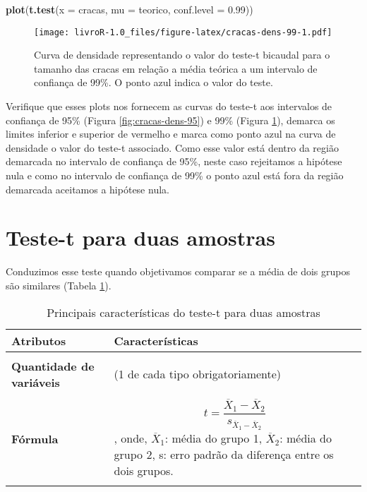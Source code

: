 \documentclass[titlepage, oneside, openany, a4paper]{book}
\newenvironment{Shaded}{\begin{snugshade}}{\end{snugshade}}
\newcommand{\DataTypeTok}[1]{\textcolor[rgb]{0.13,0.29,0.53}{#1}}
\newcommand{\FloatTok}[1]{\textcolor[rgb]{0.00,0.00,0.81}{#1}}
\newcommand{\KeywordTok}[1]{\textcolor[rgb]{0.13,0.29,0.53}{\textbf{#1}}}
\newcommand{\NormalTok}[1]{#1}
\begin{document}
\begin{Shaded}
\begin{Highlighting}[]
\KeywordTok{plot}\NormalTok{(}\KeywordTok{t.test}\NormalTok{(}\DataTypeTok{x =}\NormalTok{ cracas, }\DataTypeTok{mu =}\NormalTok{ teorico, }\DataTypeTok{conf.level =} \FloatTok{0.99}\NormalTok{))}
\end{Highlighting}
\end{Shaded}

\begin{figure}
\centering
\texttt{[image: livroR-1.0\_files/figure-latex/cracas-dens-99-1.pdf]}
\caption{\label{fig:cracas-dens-99}Curva de densidade representando o valor do teste-t bicaudal para o tamanho das cracas em relação a média teórica a um intervalo de confiança de 99\%. O ponto azul indica o valor do teste.}
\end{figure}

Verifique que esses plots nos fornecem as curvas do teste-t aos intervalos de confiança de 95\% (Figura \ref{fig:cracas-dens-95}) e 99\% (Figura \ref{fig:cracas-dens-99}), demarca os limites inferior e superior de vermelho e marca como ponto azul na curva de densidade o valor do teste-t associado. Como esse valor está dentro da região demarcada no intervalo de confiança de 95\%, neste caso rejeitamos a hipótese nula e como no intervalo de confiança de 99\% o ponto azul está fora da região demarcada aceitamos a hipótese nula.

\hypertarget{teste-t-para-duas-amostras}{%
\section{Teste-t para duas amostras}\label{teste-t-para-duas-amostras}}

Conduzimos esse teste quando objetivamos comparar se a média de dois grupos são similares (Tabela \ref{tab:tab2t}).

\begin{table}

\caption{\label{tab:tab2t}Principais características do teste-t para duas amostras}
\centering
\begin{tabular}[c]{>{\raggedright\arraybackslash}p{10em}>{\raggedright\arraybackslash}p{30em}}
\toprule
Atributos & Características\\
\midrule
\textbf{\cellcolor{gray!6}{Tipo de variável}} & \cellcolor{gray!6}{Quantitativa e categórica}\\
\textbf{Quantidade de variáveis} & 2 (1 de cada tipo obrigatoriamente)\\
\textbf{\cellcolor{gray!6}{Hipótese nula}} & \cellcolor{gray!6}{A diferença na média da variável quantitativa dos grupos é igual a 0.}\\
\textbf{Fórmula} & $$t=\frac{\overline{X}_1-\overline{X}_2}{s_{\overline{X}_1-\overline{X}_2}}$$, onde, $\overline{X}_1$: média do grupo 1, $\overline{X}_2$: média do grupo 2, s: erro padrão da diferença entre os dois grupos.\\
\textbf{\cellcolor{gray!6}{Observação}} & \cellcolor{gray!6}{Não há a necessidade de post-hoc nem expressa-la graficamente.}\\
\bottomrule
\end{tabular}
\end{table}
\end{document}
